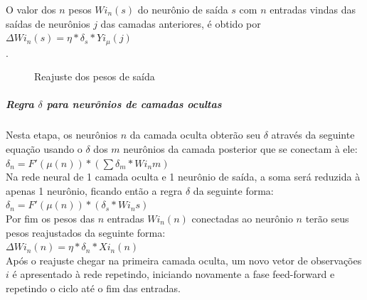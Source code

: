 \documentclass[	12pt, Times, openright, twoside, a4paper, english, brazil]{abntex2}
\begin{document}
            O valor dos $n$ pesos $Wi_{n}(s)$ do neurônio de saída $s$ com $n$ entradas vindas das saídas de neurônios $j$ das camadas anteriores, é obtido por $\Delta Wi_{n}(s) = \eta*\delta_s*Yi_{\mu}(j)$\\.
            \begin{figure}[!ht]
          	\caption{Reajuste dos pesos de saída}
           \end{figure}
           \subparagraph*{Regra $\delta$ para neurônios de camadas ocultas}
            Nesta etapa, os neurônios $n$ da camada oculta obterão seu $\delta$ através da seguinte equação usando o $\delta$ dos $m$ neurônios da camada posterior que se conectam à ele:\\ 
            
            $\delta_n = F'(\mu(n))*(\sum \delta_m*Wi_{n}m)$\\
            
            Na rede neural de 1 camada oculta e 1 neurônio de saída, a soma será reduzida à apenas 1 neurônio, ficando então a regra $\delta$ da seguinte forma:\\
            
            $\delta_n = F'(\mu(n))*(\delta_s*Wi_{n}s)$\\
            
            Por fim os pesos das $n$ entradas $Wi_{n}(n)$ conectadas ao neurônio $n$ terão seus pesos reajustados da seguinte forma:\\
            $\Delta Wi_{n}(n) = \eta*\delta_n*Xi_{n}(n)$\\
            
            Após o reajuste chegar na primeira camada oculta, um novo vetor de observações $i$ é apresentado à rede repetindo, iniciando novamente a fase feed-forward e repetindo o ciclo até o fim das entradas.
            
\end{document}
